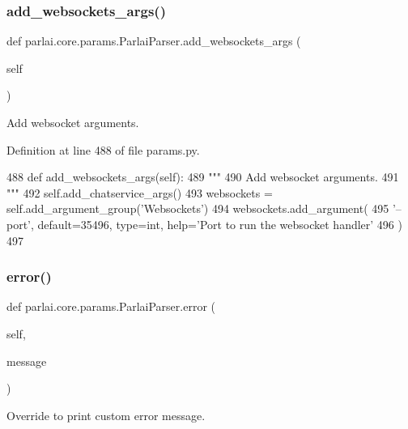 \subsubsection{\texorpdfstring{add\+\_\+websockets\+\_\+args()}{add\_websockets\_args()}}
{\footnotesize\ttfamily def parlai.\+core.\+params.\+Parlai\+Parser.\+add\+\_\+websockets\+\_\+args (\begin{DoxyParamCaption}\item[{}]{self }\end{DoxyParamCaption})}

\begin{DoxyVerb}Add websocket arguments.
\end{DoxyVerb}
 

Definition at line 488 of file params.\+py.


\begin{DoxyCode}
488     \textcolor{keyword}{def }add\_websockets\_args(self):
489         \textcolor{stringliteral}{"""}
490 \textcolor{stringliteral}{        Add websocket arguments.}
491 \textcolor{stringliteral}{        """}
492         self.add\_chatservice\_args()
493         websockets = self.add\_argument\_group(\textcolor{stringliteral}{'Websockets'})
494         websockets.add\_argument(
495             \textcolor{stringliteral}{'--port'}, default=35496, type=int, help=\textcolor{stringliteral}{'Port to run the websocket handler'}
496         )
497 
\end{DoxyCode}
\mbox{\label{classparlai_1_1core_1_1params_1_1ParlaiParser_a8d0cb15ecc35f82c94b5a19c2a6a9d12}} 
\subsubsection{\texorpdfstring{error()}{error()}}
{\footnotesize\ttfamily def parlai.\+core.\+params.\+Parlai\+Parser.\+error (\begin{DoxyParamCaption}\item[{}]{self,  }\item[{}]{message }\end{DoxyParamCaption})}

\begin{DoxyVerb}Override to print custom error message.
\end{DoxyVerb}
 

